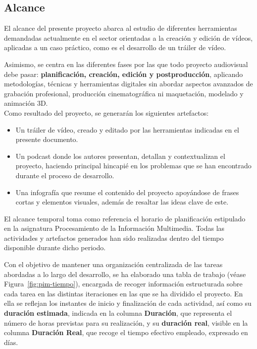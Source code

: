 \subsection{Alcance}

El alcance del presente proyecto abarca al estudio de diferentes herramientas 
demandadas actualmente en el sector orientadas a la creación y edición de vídeos, 
aplicadas a un caso práctico, como es el desarrollo de un tráiler de vídeo.

Asimismo, se centra en las diferentes fases por las que todo proyecto audiovisual debe pasar: 
\textbf{planificación, creación, edición y postproducción}, 
aplicando metodologías, técnicas y herramientas digitales sin abordar aspectos avanzados 
de grabación profesional, producción cinematográfica ni maquetación, modelado y animación 3D.\\
Como resultado del proyecto, se generarán los siguientes artefactos:
\begin{itemize}
    \item Un tráiler de vídeo, creado y editado por las herramientas indicadas 
    en el presente documento.
    \item Un podcast donde los autores presentan, detallan y contextualizan el proyecto, 
    haciendo principal hincapié en los problemas que se han encontrado durante el proceso 
    de desarrollo.
    \item Una infografía que resume el contenido del proyecto apoyándose de frases 
    cortas y elementos visuales, además de resaltar las ideas clave de este.
\end{itemize}

El alcance temporal toma como referencia el horario de planificación estipulado 
en la asignatura Procesamiento de la Información Multimedia. 
Todas las actividades y artefactos generados han sido realizadas dentro del tiempo 
disponible durante dicho periodo.

Con el objetivo de mantener una organización centralizada de las tareas abordadas a lo largo del desarrollo,
se ha elaborado una tabla de trabajo (véase Figura~\ref{fig:pim-tiempo}), encargada de recoger información 
estructurada sobre cada tarea en las distintas iteraciones en las que se ha dividido el proyecto. En ella se 
reflejan los instantes de inicio y finalización de cada actividad, así como su \textbf{duración estimada}, indicada en la columna \textbf{Duración}, que representa el número de horas previstas para su realización, 
y su \textbf{duración real}, visible en la columna \textbf{Duración Real}, que recoge el tiempo efectivo empleado, 
expresado en días.

